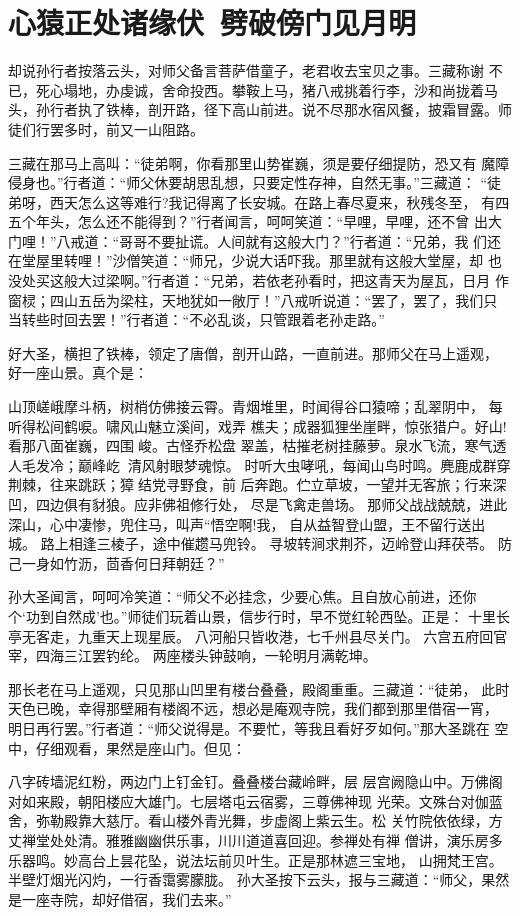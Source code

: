 \chapter{心猿正处诸缘伏~劈破傍门见月明}

却说孙行者按落云头，对师父备言菩萨借童子，老君收去宝贝之事。三藏称谢
不已，死心塌地，办虔诚，舍命投西。攀鞍上马，猪八戒挑着行李，沙和尚拢着马
头，孙行者执了铁棒，剖开路，径下高山前进。说不尽那水宿风餐，披霜冒露。师
徒们行罢多时，前又一山阻路。

三藏在那马上高叫：“徒弟啊，你看那里山势崔巍，须是要仔细提防，恐又有
魔障侵身也。”行者道：“师父休要胡思乱想，只要定性存神，自然无事。”三藏道：
“徒弟呀，西天怎么这等难行?我记得离了长安城。在路上春尽夏来，秋残冬至，
有四五个年头，怎么还不能得到？”行者闻言，呵呵笑道：“早哩，早哩，还不曾
出大门哩！”八戒道：“哥哥不要扯谎。人间就有这般大门？”行者道：“兄弟，我
们还在堂屋里转哩！”沙僧笑道：“师兄，少说大话吓我。那里就有这般大堂屋，却
也没处买这般大过梁啊。”行者道：“兄弟，若依老孙看时，把这青天为屋瓦，日月
作窗棂；四山五岳为梁柱，天地犹如一敞厅！”八戒听说道：“罢了，罢了，我们只
当转些时回去罢！”行者道：“不必乱谈，只管跟着老孙走路。”

好大圣，横担了铁棒，领定了唐僧，剖开山路，一直前进。那师父在马上遥观，
好一座山景。真个是：

山顶嵯峨摩斗柄，树梢仿佛接云霄。青烟堆里，时闻得谷口猿啼；乱翠阴中，
每听得松间鹤唳。啸风山魅立溪间，戏弄
樵夫；成器狐狸坐崖畔，惊张猎户。好山!看那八面崔巍，四围峻。古怪乔松盘
翠盖，枯摧老树挂藤萝。泉水飞流，寒气透人毛发冷；巅峰屹，清风射眼梦魂惊。
时听大虫哮吼，每闻山鸟时鸣。麂鹿成群穿荆棘，往来跳跃；獐结党寻野食，前
后奔跑。伫立草坡，一望并无客旅；行来深凹，四边俱有豺狼。应非佛祖修行处，
尽是飞禽走兽场。
那师父战战兢兢，进此深山，心中凄惨，兜住马，叫声“悟空啊!我，
自从益智登山盟，王不留行送出城。
路上相逢三棱子，途中催趱马兜铃。
寻坡转涧求荆芥，迈岭登山拜茯苓。
防己一身如竹沥，茴香何日拜朝廷？”

孙大圣闻言，呵呵冷笑道：“师父不必挂念，少要心焦。且自放心前进，还你
个‘功到自然成’也。”师徒们玩着山景，信步行时，早不觉红轮西坠。正是：
十里长亭无客走，九重天上现星辰。
八河船只皆收港，七千州县尽关门。
六宫五府回官宰，四海三江罢钓纶。
两座楼头钟鼓响，一轮明月满乾坤。

那长老在马上遥观，只见那山凹里有楼台叠叠，殿阁重重。三藏道：“徒弟，
此时天色已晚，幸得那壁厢有楼阁不远，想必是庵观寺院，我们都到那里借宿一宵，
明日再行罢。”行者道：“师父说得是。不要忙，等我且看好歹如何。”那大圣跳在
空中，仔细观看，果然是座山门。但见：

八字砖墙泥红粉，两边门上钉金钉。叠叠楼台藏岭畔，层
层宫阙隐山中。万佛阁对如来殿，朝阳楼应大雄门。七层塔屯云宿雾，三尊佛神现
光荣。文殊台对伽蓝舍，弥勒殿靠大慈厅。看山楼外青光舞，步虚阁上紫云生。松
关竹院依依绿，方丈禅堂处处清。雅雅幽幽供乐事，川川道道喜回迎。参禅处有禅
僧讲，演乐房多乐器鸣。妙高台上昙花坠，说法坛前贝叶生。正是那林遮三宝地，
山拥梵王宫。半壁灯烟光闪灼，一行香霭雾朦胧。
孙大圣按下云头，报与三藏道：“师父，果然是一座寺院，却好借宿，我们去来。”

